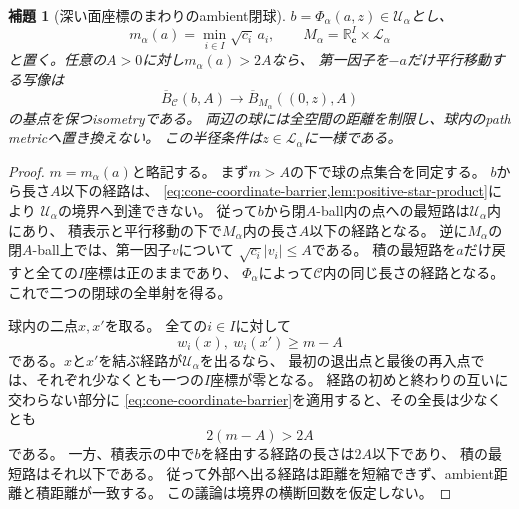 \documentclass[11pt,a4paper]{ltjsarticle}
\newcommand{\RR}{\mathbb R}
\newcommand{\cC}{\mathcal C}
\newcommand{\ov}{\overline}
\theoremstyle{plain}
\newtheorem{lemma}[lemma]{補題}
\theoremstyle{definition}
\theoremstyle{remark}
\begin{document}
\begin{lemma}[深い面座標のまわりのambient閉球]
\label{lem:star-ball-isometry}
$b=\Phi_\alpha(a,z)\in\mathcal U_\alpha$とし、
\[
 m_\alpha(a)=\min_{i\in I}\sqrt{c_i}\,a_i,
 \qquad
 M_\alpha=\RR^I_{\bm c}\times\mathcal L_\alpha
\]
と置く。任意の$A>0$に対し$m_\alpha(a)>2A$なら、
第一因子を$-a$だけ平行移動する写像は
\[
 \ov B_\cC(b,A)
 \longrightarrow
 \ov B_{M_\alpha}((0,z),A)
\]
の基点を保つisometryである。
両辺の球には全空間の距離を制限し、球内のpath metricへ置き換えない。
この半径条件は$z\in\mathcal L_\alpha$に一様である。
\end{lemma}
\begin{proof}
$m=m_\alpha(a)$と略記する。
まず$m>A$の下で球の点集合を同定する。
$b$から長さ$A$以下の経路は、
\cref{eq:cone-coordinate-barrier,lem:positive-star-product}により
$\mathcal U_\alpha$の境界へ到達できない。
従って$b$から閉$A$-ball内の点への最短路は$\mathcal U_\alpha$内にあり、
積表示と平行移動の下で$M_\alpha$内の長さ$A$以下の経路となる。
逆に$M_\alpha$の閉$A$-ball上では、第一因子$v$について
$\sqrt{c_i}|v_i|\le A$である。
積の最短路を$a$だけ戻すと全ての$I$座標は正のままであり、
$\Phi_\alpha$によって$\cC$内の同じ長さの経路となる。
これで二つの閉球の全単射を得る。

球内の二点$x,x'$を取る。
全ての$i\in I$に対して
\[
 w_i(x),\ w_i(x')\ge m-A
\]
である。$x$と$x'$を結ぶ経路が$\mathcal U_\alpha$を出るなら、
最初の退出点と最後の再入点では、それぞれ少なくとも一つの$I$座標が零となる。
経路の初めと終わりの互いに交わらない部分に
\cref{eq:cone-coordinate-barrier}を適用すると、その全長は少なくとも
\[
 2(m-A)>2A
\]
である。
一方、積表示の中で$b$を経由する経路の長さは$2A$以下であり、
積の最短路はそれ以下である。
従って外部へ出る経路は距離を短縮できず、ambient距離と積距離が一致する。
この議論は境界の横断回数を仮定しない。
\end{proof}
\end{document}
